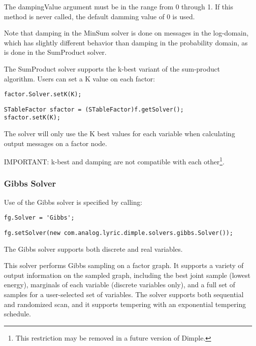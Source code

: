 The dampingValue argument must be in the range from 0 through 1.  If this method is never called, the default damming value of 0 is used.

Note that damping in the MinSum solver is done on messages in the log-domain, which has slightly different behavior than damping in the probability domain, as is done in the SumProduct solver.



The SumProduct solver supports the k-best variant of the sum-product algorithm.  Users can set a K value on each factor:

\ifmatlab
\begin{lstlisting}
factor.Solver.setK(K);
\end{lstlisting}
\fi

\ifjava
\begin{lstlisting}
STableFactor sfactor = (STableFactor)f.getSolver();
sfactor.setK(K);
\end{lstlisting}
\fi

The solver will only use the K best values for each variable when calculating output messages on a factor node.

IMPORTANT: k-best and damping are not compatible with each other\footnote{This restriction may be removed in a future version of Dimple.}.


\subsubsection{Gibbs Solver}
\label{sec:GibbsSolverAPI}

Use of the Gibbs solver is specified by calling:

\ifmatlab
\begin{lstlisting}
fg.Solver = 'Gibbs';
\end{lstlisting}
\fi

\ifjava
\begin{lstlisting}
fg.setSolver(new com.analog.lyric.dimple.solvers.gibbs.Solver());
\end{lstlisting}
\fi

The Gibbs solver supports both discrete and real variables.

This solver performs Gibbs sampling on a factor graph.  It supports a variety of output information on the sampled graph, including the best joint sample (lowest energy), marginals of each variable (discrete variables only), and a full set of samples for a user-selected set of variables.  The solver supports both sequential and randomized scan, and it supports tempering with an exponential tempering schedule.

